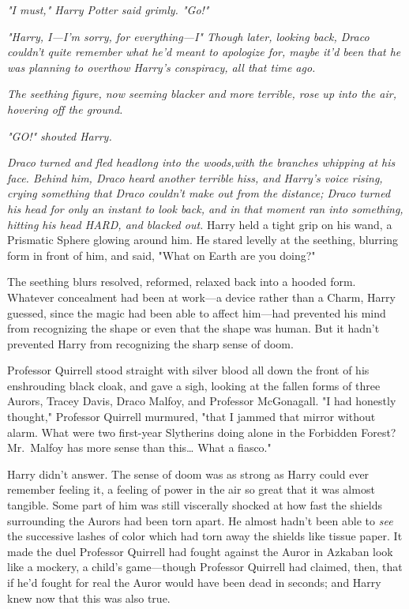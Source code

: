 \emph{"I must," Harry Potter said grimly. "Go!"}

\emph{"Harry, I---I'm sorry, for everything---I" Though later, looking back, 
Draco couldn't quite remember what he'd meant to apologize for, maybe it'd been 
that he was planning to overthow Harry's conspiracy, all that time ago.}

\emph{The seething figure, now seeming blacker and more terrible, rose up into 
the air, hovering off the ground.}

\emph{"GO!" shouted Harry.}

\emph{Draco turned and fled headlong into the woods,with the branches whipping 
at his face. Behind him, Draco heard another terrible hiss, and Harry's voice 
rising, crying something that Draco couldn't make out from the distance; Draco 
turned his head for only an instant to look back, and in that moment ran into 
something, hitting his head HARD, and blacked out.}
\sbreak
Harry held a tight grip on his wand, a Prismatic Sphere glowing around him. He 
stared levelly at the seething, blurring form in front of him, and said, "What 
on Earth are you doing?"

The seething blurs resolved, reformed, relaxed back into a hooded form. 
Whatever concealment had been at work---a device rather than a Charm, Harry 
guessed, since the magic had been able to affect him---had prevented his mind 
from recognizing the shape or even that the shape was human. But it hadn't 
prevented Harry from recognizing the sharp sense of doom.

Professor Quirrell stood straight with silver blood all down the front of his 
enshrouding black cloak, and gave a sigh, looking at the fallen forms of three 
Aurors, Tracey Davis, Draco Malfoy, and Professor McGonagall. "I had honestly 
thought," Professor Quirrell murmured, "that I jammed that mirror without 
alarm. What were two first-year Slytherins doing alone in the Forbidden Forest? 
Mr.~Malfoy has more sense than this{\ldots} What a fiasco."

Harry didn't answer. The sense of doom was as strong as Harry could ever 
remember feeling it, a feeling of power in the air so great that it was almost 
tangible. Some part of him was still viscerally shocked at how fast the shields 
surrounding the Aurors had been torn apart. He almost hadn't been able to 
\emph{see} the successive lashes of color which had torn away the shields like 
tissue paper. It made the duel Professor Quirrell had fought against the Auror 
in Azkaban look like a mockery, a child's game---though Professor Quirrell had 
claimed, then, that if he'd fought for real the Auror would have been dead in 
seconds; and Harry knew now that this was also true.

